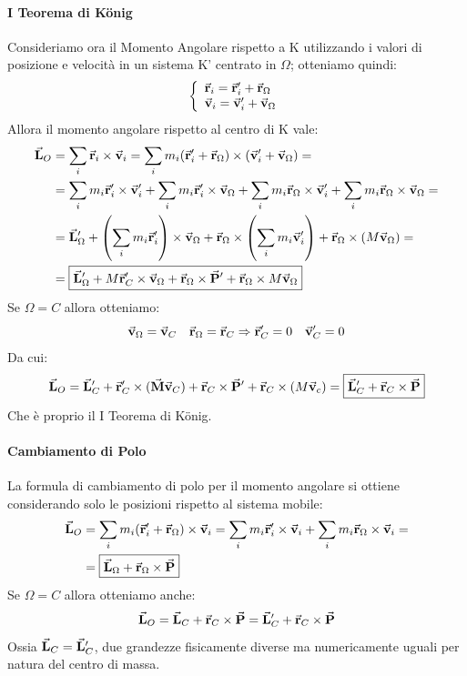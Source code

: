 \documentclass{article}
\newcommand{\then}{\ensuremath{\Rightarrow}}
\renewcommand{\v}{\va{v}}
\renewcommand{\r}{\va{r}}
\newcommand{\M}{\va{M}}
\renewcommand{\P}{\va{P}}
\renewcommand{\L}{\va{L}}
\begin{document}
\paragraph{I Teorema di König}
Consideriamo ora il Momento Angolare rispetto a K utilizzando i valori di posizione e velocità in un sistema K' centrato in $\Omega$; otteniamo quindi:
\[\left\{\begin{array}{l}
    \r_i=\r_i'+\r_{\Omega}   \\
     \v_i=\v_i'+\v_{\Omega}
\end{array}\right.\]
Allora il momento angolare rispetto al centro di K vale:
\begin{equation}
\begin{split}
    \L_O&=\sum_i\r_i\times\v_i=\sum_im_i(\r_i'+\r_{\Omega})\times(\v_i'+\v_{\Omega})=\\
    &=\sum_im_i\r_i'\times\v_i'+\sum_im_i\r_i'\times\v_{\Omega}+\sum_im_i\r_{\Omega}\times\v_i'+\sum_im_i\r_{\Omega}\times\v_{\Omega}=\\
    &=\L_{\Omega}'+\left(\sum_im_i\r_i'\right)\times\v_{\Omega}+\r_{\Omega}\times\left(\sum_im_i\v_i'\right)+\r_{\Omega}\times(M\v_{\Omega})=\\
    &=\boxed{\L_{\Omega}'+M\r_C'\times\v_{\Omega}+\r_{\Omega}\times\P'+\r_{\Omega}\times M\v_{\Omega}}
\end{split}
\end{equation}
Se $\Omega=C$ allora otteniamo:
\[\v_{\Omega}=\v_C\quad\r_{\Omega}=\r_C\then \r_C'=0\quad\v_C'=0\]
Da cui:
\begin{equation}
    \L_O=\L_C'+\r_C'\times(\M\v_C)+\r_C\times\P'+\r_C\times(M\v_c)=\boxed{\L_C'+\r_C\times\P}
\end{equation}
Che è proprio il I Teorema di König.
\paragraph{Cambiamento di Polo}
La formula di cambiamento di polo per il momento angolare si ottiene considerando solo le posizioni rispetto al sistema mobile:
\begin{equation}
\begin{split}
    \L_O&=\sum_im_i(\r_i'+\r_{\Omega})\times\v_i=\sum_im_i\r_i'\times\v_i+\sum_im_i\r_{\Omega}\times\v_i=\\
    &=\boxed{\L_{\Omega}+\r_{\Omega}\times\P}
\end{split}
\end{equation}
Se $\Omega=C$ allora otteniamo anche:
\[\L_O=\L_C+\r_C\times\P=\L_C'+\r_C\times\P\]
Ossia $\L_C=\L_C'$, due grandezze fisicamente diverse ma numericamente uguali per natura del centro di massa.
\end{document}
